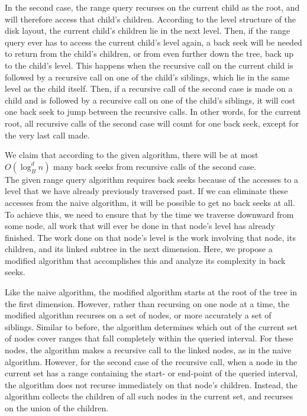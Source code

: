 \documentclass[11pt, oneside]{article}
\begin{document}
In the second case, the range query recurses on the current child as the root,
and will therefore access that child's children. According to the level
structure of the disk layout, the current child's children lie in the next
level. Then, if the range query ever has to access the current child's level
again, a back seek will be needed to return from the child's children, or from
even further down the tree, back up to the child's level. This happens when the
recursive call on the current child is followed by a recursive call on one of
the child's siblings, which lie in the same level as the child itself. Then, if
a recursive call of the second case is made on a child and is followed by a
recursive call on one of the child's siblings, it will cost one back seek to
jump between the recursive calls. In other words, for the current root, all
recursive calls of the second case will count for one back seek, except for the
very last call made. 

We claim that according to the given algorithm, there will be at most
$O(\log_B^dn)$ many back seeks from recursive calls of the second case. \\


The given range query algorithm requires back seeks because of the accesses to
a level that we have already previously traversed past. If we can eliminate
these accesses from the naive algorithm, it will be possible to get no back
seeks at all. To achieve this, we need to ensure that by the time we traverse
downward from some node, all work that will ever be done in that node's level
has already finished. The work done on that node's level is the work involving
that node, its children, and its linked subtree in the next dimension. Here, we
propose a modified algorithm that accomplishes this and analyze its complexity
in back seeks.

Like the naive algorithm, the modified algorithm starts at the root of the tree
in the first dimension. However, rather than recursing on one node at a time,
the modified algorithm recurses on a set of nodes, or more accurately a set of
siblings. Similar to before, the algorithm determines which out of the current
set of nodes cover ranges that fall completely within the queried interval. For
these nodes, the algorithm makes a recursive call to the linked nodes, as in
the naive algorithm. However, for the second case of the recursive call, when a
node in the current set has a range containing the start- or end-point of the
queried interval, the algorithm does not recurse immediately on that node's
children. Instead, the algorithm collects the children of all such nodes in the
current set, and recurses on the union of the children.
\end{document}
